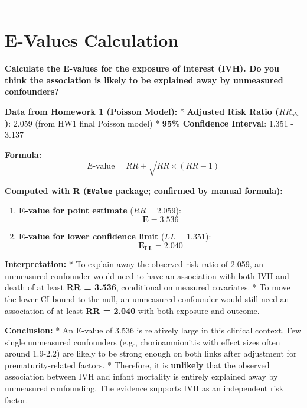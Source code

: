 \documentclass[
]{article}
\begin{document}
\begin{center}\rule{0.5\linewidth}{0.5pt}\end{center}

\hypertarget{e-values-calculation}{%
\section{E-Values Calculation}\label{e-values-calculation}}

\textbf{Calculate the E-values for the exposure of interest (IVH). Do
you think the association is likely to be explained away by unmeasured
confounders?}

\textbf{Data from Homework 1 (Poisson Model):} * \textbf{Adjusted Risk
Ratio (\(RR_{obs}\))}: 2.059 (from HW1 final Poisson model) *
\textbf{95\% Confidence Interval}: 1.351 - 3.137

\textbf{Formula:} \[ E\text{-value} = RR + \sqrt{RR \times (RR - 1)} \]

\textbf{Computed with R (\texttt{EValue} package; confirmed by manual
formula):}

\begin{enumerate}
\def\labelenumi{\arabic{enumi}.}
\item
  \textbf{E-value for point estimate} (\(RR=2.059\)):\\
  \[ \mathbf{E = 3.536} \]
\item
  \textbf{E-value for lower confidence limit} (\(LL=1.351\)):\\
  \[ \mathbf{E_{LL} = 2.040} \]
\end{enumerate}

\textbf{Interpretation:} * To explain away the observed risk ratio of
2.059, an unmeasured confounder would need to have an association with
both IVH and death of at least \textbf{RR = 3.536}, conditional on
measured covariates. * To move the lower CI bound to the null, an
unmeasured confounder would still need an association of at least
\textbf{RR = 2.040} with both exposure and outcome.

\textbf{Conclusion:} * An E-value of 3.536 is relatively large in this
clinical context. Few single unmeasured confounders (e.g.,
chorioamnionitis with effect sizes often around 1.9-2.2) are likely to
be strong enough on both links after adjustment for prematurity-related
factors. * Therefore, it is \textbf{unlikely} that the observed
association between IVH and infant mortality is entirely explained away
by unmeasured confounding. The evidence supports IVH as an independent
risk factor.
\end{document}
